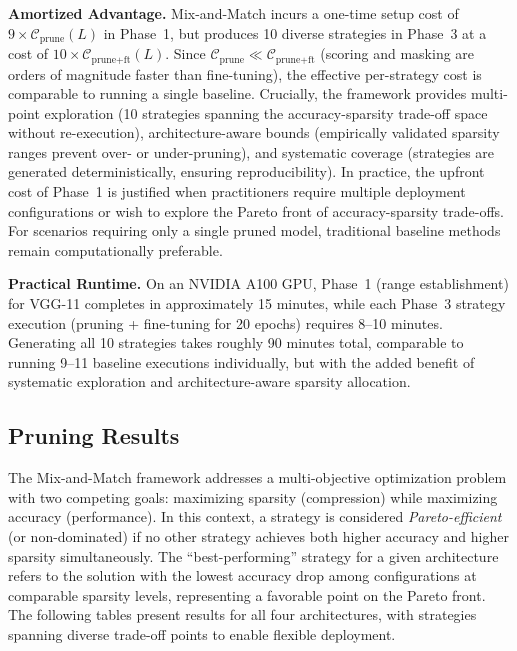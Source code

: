 \documentclass[11pt, conference]{IEEEtran}
\begin{document}
\textbf{Amortized Advantage.}
Mix-and-Match incurs a one-time setup cost of $9 \times \mathcal{C}_{\text{prune}}(L)$ in Phase~1, but produces 10 diverse strategies in Phase~3 at a cost of $10 \times \mathcal{C}_{\text{prune+ft}}(L)$. Since $\mathcal{C}_{\text{prune}} \ll \mathcal{C}_{\text{prune+ft}}$ (scoring and masking are orders of magnitude faster than fine-tuning), the effective per-strategy cost is comparable to running a single baseline. Crucially, the framework provides multi-point exploration (10 strategies spanning the accuracy-sparsity trade-off space without re-execution), architecture-aware bounds (empirically validated sparsity ranges prevent over- or under-pruning), and systematic coverage (strategies are generated deterministically, ensuring reproducibility). In practice, the upfront cost of Phase~1 is justified when practitioners require multiple deployment configurations or wish to explore the Pareto front of accuracy-sparsity trade-offs. For scenarios requiring only a single pruned model, traditional baseline methods remain computationally preferable.

\textbf{Practical Runtime.}
On an NVIDIA A100 GPU, Phase~1 (range establishment) for VGG-11 completes in approximately 15 minutes, while each Phase~3 strategy execution (pruning + fine-tuning for 20 epochs) requires 8--10 minutes. Generating all 10 strategies takes roughly 90 minutes total, comparable to running 9--11 baseline executions individually, but with the added benefit of systematic exploration and architecture-aware sparsity allocation.

\FloatBarrier
\subsection{Pruning Results}

The Mix-and-Match framework addresses a multi-objective optimization problem with two competing goals: maximizing sparsity (compression) while maximizing accuracy (performance). In this context, a strategy is considered \textit{Pareto-efficient} (or non-dominated) if no other strategy achieves both higher accuracy and higher sparsity simultaneously. The ``best-performing'' strategy for a given architecture refers to the solution with the lowest accuracy drop among configurations at comparable sparsity levels, representing a favorable point on the Pareto front. The following tables present results for all four architectures, with strategies spanning diverse trade-off points to enable flexible deployment.
\end{document}
